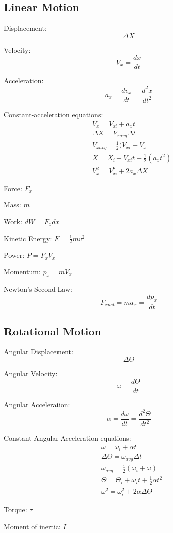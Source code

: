 \documentclass[8pt, twocolumn]{article}
\begin{document}
\subsection{Linear Motion}
	Displacement:
	\[\Delta X\]

	Velocity:
	\[V_x = \frac{dx}{dt}\]

	Acceleration:
	\[a_x = \frac{dv_x}{dt} = \frac{d^2x}{dt^2}\]

	Constant-acceleration equations:
	\[\begin{aligned}
		&V_x = V_{xi} + a_xt \\
		&\Delta X = V_{x avg}\Delta t \\
		&V_{x avg} = \frac{1}{2}(V_{xi} + V_x \\
		&X = X_i + V_{xi}t + \frac{1}{2}(a_xt^2) \\
		&V_x^2 = V_{xi}^2 + 2a_x\Delta X
	\end{aligned}\]

	Force: $F_x$

	Mass: $m$

	Work: $dW = F_xdx$

	Kinetic Energy: $K = \frac{1}{2}mv^2$

	Power: $P = F_x V_x$

	Momentum: $p_x = mV_x$

	Newton's Second Law:
	\[F_{x net} = ma_x = \frac{dp_x}{dt}\]

\subsection{Rotational Motion}
	Angular Displacement:
	\[\Delta \Theta\]

	Angular Velocity:
	\[\omega = \frac{d\Theta}{dt}\]

	Angular Acceleration:
	\[\alpha = \frac{d\omega}{dt} = \frac{d^2\Theta}{dt^2}\]

	Constant Angular Acceleration equations:
	\[\begin{aligned}
		&\omega = \omega_i + \alpha t \\
		&\Delta \Theta = \omega_{avg}\Delta t \\
		&\omega_{avg} = \frac{1}{2}(\omega_i + \omega) \\
		&\Theta = \Theta_i + \omega_i t + \frac{1}{2}\alpha t^2 \\
		&\omega^2 = \omega_i^2 + 2\alpha \Delta \Theta
	\end{aligned}\]

	Torque: $\tau$

	Moment of inertia: $I$
\end{document}
